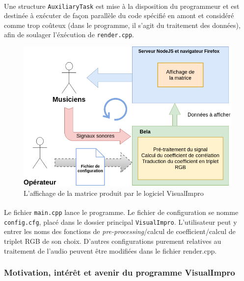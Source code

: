 \paragraph{}
Une structure \verb!AuxiliaryTask! est mise à la disposition du
programmeur et est destinée à exécuter de façon parallèle du code spécifié
en amont et considéré comme trop coûteux (dans le programme, il s'agit du
traitement des données), afin de soulager l'éxécution de \verb!render.cpp!.

\begin{figure}[H]
 \centering
 \includegraphics[scale=0.2]{assets/visualimpro.png}
 \caption{L'affichage de la matrice produit par le logiciel VisualImpro}
 \label{bela}
\end{figure}

\paragraph{}
Le fichier \verb!main.cpp! lance le programme. Le fichier de
configuration se nomme \\\verb!config.cfg!, placé dans le dossier
principal \verb!VisualImpro!.  L'utilisateur peut y entrer les noms
des fonctions de \textit{pre-processing}/calcul de coefficient/calcul
de triplet RGB de son choix. D'autres configurations purement
relatives au traitement de l'audio peuvent être modifiées dans le
fichier render.cpp.

\subsubsection{Motivation, intérêt et avenir du programme VisualImpro}
